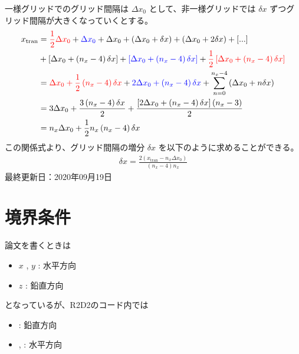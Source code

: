 \documentclass[letterpaper,10pt,dvipdfmx,report]{sphinxmanual}
\begin{document}
一様グリッドでのグリッド間隔は \(\Delta x_0\) として、非一様グリッドでは \(\delta x\) ずつグリッド間隔が大きくなっていくとする。
\begin{equation*}
\begin{split}x_\mathrm{tran}&={\color{red} \frac{1}{2} \Delta x_0} + {\color{blue} \Delta x_0} + \Delta x_0
+ \left(\Delta x_0 + \delta x\right)
+ \left(\Delta x_0 + 2\delta x\right) + [...] \\
&+ \left[\Delta x_0 + \left(n_x - 4\right)\delta x\right]
+ {\color{blue}\left[\Delta x_0 + \left(n_x - 4\right)\delta x\right]}
+ {\color{red}\frac{1}{2}\left[\Delta x_0 + \left(n_x - 4\right)\delta x\right]} \\
&= {\color{red} \Delta x_0 + \frac{1}{2}\left(n_x-4\right)\delta x}
+{\color{blue} 2\Delta x_0 + \left(n_x - 4\right)\delta x}
+ \sum_{n=0}^{n_x - 4}\left(\Delta x_0 + n\delta x\right) \\
&= 3\Delta x_0 + \frac{3\left(n_x-4\right)\delta x}{2}
+ \frac{\left[2\Delta x_0 + \left(n_x-4\right)\delta x\right]\left(n_x - 3\right)}{2} \\
&= n_x \Delta x_0 + \frac{1}{2} n_x\left(n_x - 4\right)\delta x\end{split}
\end{equation*}
この関係式より、グリッド間隔の増分 \(\delta x\) を以下のように求めることができる。
\begin{equation*}
\begin{split}\delta x = \frac{2\left(x_\mathrm{tran} - n_x\Delta x_0\right)}{\left(n_x - 4\right)n_x}\end{split}
\end{equation*}
最終更新日：2020年09月19日


\chapter{境界条件}
\label{\detokenize{boundary:id1}}\label{\detokenize{boundary::doc}}
論文を書くときは
\begin{itemize}
\item {} 
\(x\) , \(y\) : 水平方向

\item {} 
\(z\) : 鉛直方向

\end{itemize}

となっているが、R2D2のコード内では
\begin{itemize}
\item {} 
: 鉛直方向

\item {} 
, : 水平方向

\end{itemize}
\end{document}
